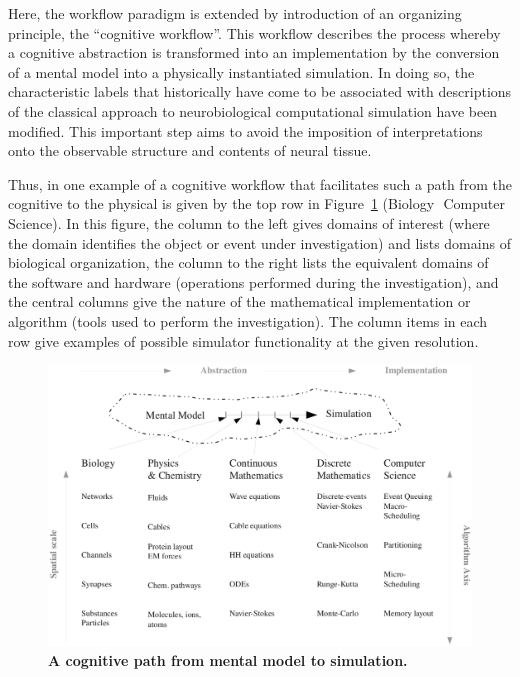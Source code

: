 \documentclass{article}
\begin{document}

Here, the workflow paradigm is extended by introduction of an organizing principle, the “cognitive workflow”. This workflow describes the process whereby a cognitive abstraction is transformed into an implementation by the conversion of a mental model into a physically instantiated simulation. In doing so, the characteristic labels that historically have come to be associated with descriptions of the classical approach to neurobiological computational simulation have been modified. This important step aims to avoid the imposition of interpretations onto the observable structure and contents of neural tissue.

Thus, in one example of a cognitive workflow that facilitates such a path from the cognitive to the physical is given by the top row in Figure~\ref{fig:mental-model-simulation-path} (Biology \textrightarrow\,\,Computer Science).  In this figure, the column to the left gives domains of interest (where the domain identifies the object or event under investigation) and lists domains of biological organization, the column to the right lists the equivalent domains of the software and hardware (operations performed during the investigation), and the central columns give the nature of the mathematical implementation or algorithm (tools used to perform the investigation).  The column items in each row give examples of possible simulator functionality at the given resolution.

\begin{figure}[h!t]
  \begin{center}
    \includegraphics[width=5in]{figures/NS-abstraction-implementation.eps}
  \end{center}
  \caption{ {\bf A cognitive path from mental model to simulation.} }
  \label{fig:mental-model-simulation-path}
\end{figure}
\end{document}
